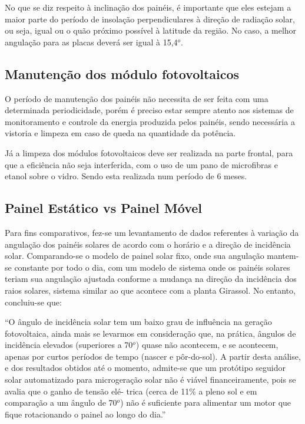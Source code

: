 	No que se diz respeito à inclinação dos painéis, é importante que eles estejam a maior parte do período de insolação perpendiculares à direção de radiação solar, ou seja, igual ou o quão próximo possível à latitude da região. No caso, a melhor angulação para as placas deverá ser igual à 15,4$^o$.

\subsection{Manutenção dos módulo fotovoltaicos}

	O período de manutenção dos painéis não necessita de ser feita com uma determinada periodicidade, porém é preciso estar sempre atento aos sistemas de monitoramento e controle da energia produzida pelos painéis, sendo necessária a vistoria e limpeza em caso de queda na quantidade da potência.

	Já a limpeza dos módulos fotovoltaicos deve ser realizada na parte frontal, para que a eficiência não seja interferida, com o uso de um pano de microfibras e etanol sobre o vidro. Sendo esta realizada num período de 6 meses.

\subsection{Painel Estático vs Painel Móvel}

	Para fins comparativos, fez-se um levantamento de dados referentes à variação da angulação dos painéis solares de acordo com o horário e a direção de incidência solar. Comparando-se o modelo de painel solar fixo, onde sua angulação mantem-se constante por todo o dia, com um modelo de sistema onde os painéis solares teriam sua angulação ajustada conforme a mudança na direção da incidência dos raios solares, sistema similar ao que acontece com a planta Girassol. No entanto, concluiu-se que:

	“O ângulo de incidência solar tem um baixo grau de influência na geração fotovoltaica, ainda mais se levarmos em consideração que, na prática, ângulos de incidência elevados (superiores a 70$^o$) quase não acontecem, e se acontecem, apenas por curtos períodos de tempo (nascer e pôr-do-sol). A partir desta análise, e dos resultados obtidos até o momento, admite-se que um protótipo seguidor solar automatizado para microgeração solar não é viável financeiramente, pois se avalia que o ganho de tensão elé- trica (cerca de 11\% a pleno sol e em comparação a um ângulo de 70$^o$) não é suficiente para alimentar um motor que fique rotacionando o painel ao longo do dia.” \cite{2011PUCAMP}


